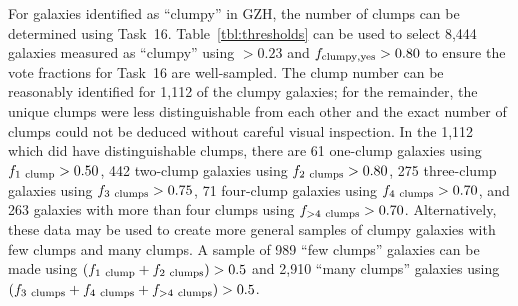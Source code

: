 \documentclass[twocolumn]{aastex6}
\begin{document}
For galaxies identified as ``clumpy'' in GZH, the number of clumps can be determined using Task~16. Table~\ref{tbl:thresholds} can be used to select 8,444 galaxies measured as ``clumpy'' using \ffeatures$> 0.23$ and $f_{\rm clumpy,yes}>0.80$ to ensure the vote fractions for Task~16 are well-sampled. The clump number can be reasonably identified for 1,112 of the clumpy galaxies; for the remainder, the unique clumps were less distinguishable from each other and the exact number of clumps could not be deduced without careful visual inspection. In the 1,112 which did have distinguishable clumps, there are 61 one-clump galaxies using $f_{\rm 1~clump}>0.50$, 442 two-clump galaxies using $f_{\rm 2~clumps}>0.80$, 275 three-clump galaxies using $f_{\rm 3~clumps}>0.75$, 71 four-clump galaxies using $f_{\rm 4~clumps} > 0.70$, and 263 galaxies with more than four clumps using $f_{\rm >4~clumps}>0.70$. Alternatively, these data may be used to create more general samples of clumpy galaxies with few clumps and many clumps. A sample of 989 ``few clumps'' galaxies can be made using $(f_{\rm 1~clump} + f_{\rm 2~clumps}) > 0.5$ and 2,910 ``many clumps'' galaxies using $(f_{\rm 3~clumps}+f_{\rm 4~clumps}+f_{\rm >4~clumps})>0.5$.
\end{document}
